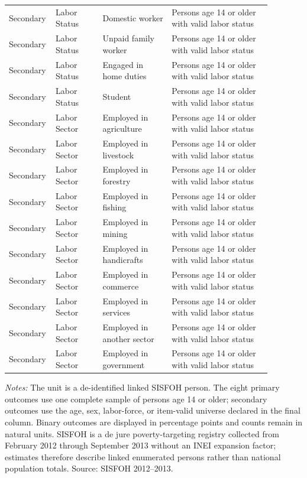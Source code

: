 \begin{longtable}{@{}>{\raggedright\arraybackslash}p{0.10\linewidth}p{0.17\linewidth}p{0.25\linewidth}p{0.36\linewidth}@{}}
Secondary & Labor Status & Domestic worker & Persons age 14 or older with valid labor status \\
Secondary & Labor Status & Unpaid family worker & Persons age 14 or older with valid labor status \\
Secondary & Labor Status & Engaged in home duties & Persons age 14 or older with valid labor status \\
Secondary & Labor Status & Student & Persons age 14 or older with valid labor status \\
Secondary & Labor Sector & Employed in agriculture & Persons age 14 or older with valid labor status \\
Secondary & Labor Sector & Employed in livestock & Persons age 14 or older with valid labor status \\
Secondary & Labor Sector & Employed in forestry & Persons age 14 or older with valid labor status \\
Secondary & Labor Sector & Employed in fishing & Persons age 14 or older with valid labor status \\
Secondary & Labor Sector & Employed in mining & Persons age 14 or older with valid labor status \\
Secondary & Labor Sector & Employed in handicrafts & Persons age 14 or older with valid labor status \\
Secondary & Labor Sector & Employed in commerce & Persons age 14 or older with valid labor status \\
Secondary & Labor Sector & Employed in services & Persons age 14 or older with valid labor status \\
Secondary & Labor Sector & Employed in another sector & Persons age 14 or older with valid labor status \\
Secondary & Labor Sector & Employed in government & Persons age 14 or older with valid labor status \\
\bottomrule\end{longtable}
\begin{minipage}{0.98\linewidth}\footnotesize\textit{Notes:} The unit is a de-identified linked SISFOH person. The eight primary outcomes use one complete sample of persons age 14 or older; secondary outcomes use the age, sex, labor-force, or item-valid universe declared in the final column. Binary outcomes are displayed in percentage points and counts remain in natural units. SISFOH is a de jure poverty-targeting registry collected from February 2012 through September 2013 without an INEI expansion factor; estimates therefore describe linked enumerated persons rather than national population totals. Source: SISFOH 2012--2013.\end{minipage}
